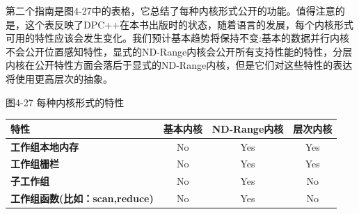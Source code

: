第二个指南是图4-27中的表格，它总结了每种内核形式公开的功能。值得注意的是，这个表反映了DPC++在本书出版时的状态，随着语言的发展，每个内核形式可用的特性应该会发生变化。我们预计基本趋势将保持不变:基本的数据并行内核不会公开位置感知特性，显式的ND-Range内核会公开所有支持性能的特性，分层内核在公开特性方面会落后于显式的ND-Range内核，但是它们对这些特性的表达将使用更高层次的抽象。\par

\hspace*{\fill} \par %
图4-27 每种内核形式的特性
\begin{table}[H]
	\begin{tabular}{|l|c|c|c|}
		\hline
		\textbf{特性}                           & \multicolumn{1}{l|}{\textbf{基本内核}} & \multicolumn{1}{l|}{\textbf{ND-Range内核}} & \multicolumn{1}{l|}{\textbf{层次内核}} \\ \hline
		\textbf{工作组本地内存}           & No                                         & Yes                                           & Yes                                              \\ \hline
		\textbf{工作组栅栏}               & No                                         & Yes                                           & Yes                                              \\ \hline
		\textbf{子工作组}                        & No                                         & Yes                                           & No                                               \\ \hline
		\textbf{工作组函数(比如：scan,reduce)} & No                                         & Yes                                           & No                                               \\ \hline
	\end{tabular}
\end{table}




